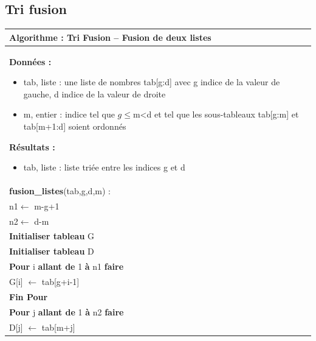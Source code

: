 \documentclass[10pt]{article}
\begin{document}
\subsection{Tri fusion}


\begin{pseudo}
\begin{center}
\begin{tabular}{p{}}
\hline
\textbf{Algorithme :} Tri Fusion -- Fusion de deux listes\\
\hline
\textbf{Données :}
\begin{itemize}
\item \textsf{tab}, liste : une liste de nombres \textsf{tab[g:d]} avec \textsf{g} indice de la valeur de gauche, \textsf{d} indice de la valeur de droite
\item \textsf{m}, entier : indice tel que \textsf{$g\leq$m<d} et tel que les sous-tableaux \textsf{tab[g:m]} et \textsf{tab[m+1:d]} soient ordonnés
\end{itemize}
\textbf{Résultats :} 
\begin{itemize}
\item \textsf{tab}, liste : liste triée entre les indices \textsf{g} et \textsf{d}
\end{itemize}
\\
\textbf{fusion\_listes}(\textsf{tab,g,d,m}) :\\
\hspace{.4cm} \textsf{n1$\leftarrow$ m-g+1}\\
\hspace{.4cm} \textsf{n2$\leftarrow$ d-m}\\
\hspace{.4cm} \textbf{Initialiser tableau} \textsf{G}  \\
\hspace{.4cm} \textbf{Initialiser tableau} \textsf{D}  \\
\hspace{.4cm} \textbf{Pour} \textsf{i} \textbf{allant de} \textsf{1} \textbf{à} \textsf{n1} \textbf{faire}\\
\hspace{.8cm}  \textsf{G[i] $ \leftarrow$ tab[g+i-1]}\\
\hspace{.4cm}  \textbf{Fin Pour}\\
\hspace{.4cm} \textbf{Pour} \textsf{j} \textbf{allant de} \textsf{1} \textbf{à} \textsf{n2} \textbf{faire}\\
\hspace{.8cm} \textsf{D[j] $ \leftarrow$ tab[m+j]}\\

\end{tabular}
\end{center}
\end{pseudo}
\end{document}
